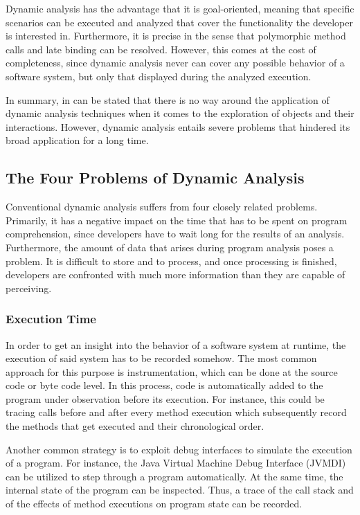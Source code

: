 Dynamic analysis has the advantage that it is goal-oriented, meaning that specific scenarios can be executed and analyzed that cover the functionality the developer is interested in.
Furthermore, it is precise in the sense that polymorphic method calls and late binding can be resolved.
However, this comes at the cost of completeness, since dynamic analysis never can cover any possible behavior of a software system, but only that displayed during the analyzed execution.

In summary, in can be stated that there is no way around the application of dynamic analysis techniques when it comes to the exploration of objects and their interactions.
However, dynamic analysis entails severe problems that hindered its broad application for a long time.

\subsection{The Four Problems of Dynamic Analysis}
\label{ss:BackgroundAnalysisProblems}
Conventional dynamic analysis suffers from four closely related problems.
Primarily, it has a negative impact on the time that has to be spent on program comprehension, since developers have to wait long for the results of an analysis.
Furthermore, the amount of data that arises during program analysis poses a problem. 
It is difficult to store and to process, and once processing is finished, developers are confronted with much more information than they are capable of perceiving.

\subsubsection{Execution Time}
In order to get an insight into the behavior of a software system at runtime, the execution of said system has to be recorded somehow.
The most common approach for this purpose is instrumentation, which can be done at the source code or byte code level.
In this process, code is automatically added to the program under observation before its execution.
For instance, this could be tracing calls before and after every method execution which subsequently record the methods that get executed and their chronological order.

Another common strategy is to exploit debug interfaces to simulate the execution of a program.
For instance, the Java Virtual Machine Debug Interface (JVMDI) can be utilized to step through a program automatically.
At the same time, the internal state of the program can be inspected.
Thus, a trace of the call stack and of the effects of method executions on program state can be recorded.

